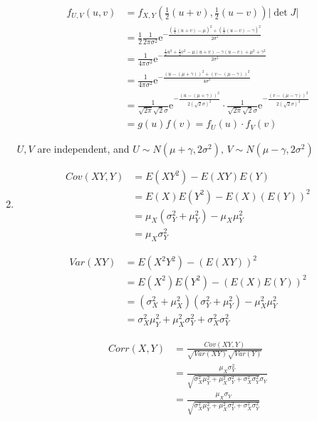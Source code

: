 \documentclass{article}
\begin{document}
\begin{enumerate}[leftmargin = 0 em, label = \arabic*., font = \bfseries]
	 \begin{align*}
	 f_{U,V}(u,v) &= f_{X,Y}(\frac{1}{2}(u+v), \frac{1}{2} (u-v))|\det J|\\
	 & =  \frac{1}{2} \frac{1}{2 \pi \sigma^2} \mathrm{e}^{- \frac{(\frac{1}{2}(u+v) - \mu)^2 + (\frac{1}{2}(u-v) - \gamma)^2}{2 \sigma^2}}\\
	 & = \frac{1}{4 \pi \sigma^2} \mathrm{e}^{- \frac{\frac{1}{2}u^2 + \frac{1}{2}v^2 - \mu(u + v) - \gamma(u - v) + \mu^2 + \gamma^2}{2 \sigma^2}}\\
	 & = \frac{1}{4 \pi \sigma^2} \mathrm{e}^{- \frac{(u - (\mu+ \gamma))^2 + (v - (\mu - \gamma))^2}{4 \sigma^2}}\\
	 & = \frac{1}{\sqrt{2 \pi} \sqrt{2}\sigma} \mathrm{e}^{- \frac{(u - (\mu + \gamma))^2}{2 (\sqrt{2}\sigma)^2}} \cdot \frac{1}{\sqrt{2 \pi} \sqrt{2}\sigma} \mathrm{e}^{- \frac{(v - (\mu - \gamma))^2}{2 (\sqrt{2}\sigma)^2}}\\
	 & = g(u)f(v) = f_U (u) \cdot f_{V}(v)
	 \end{align*}

	 $U,V$ are independent, and $U \sim N(\mu+\gamma, 2 \sigma^2),\, V \sim N(\mu - \gamma, 2 \sigma^2)$


	 \item 
	 \begin{align*}
	 Cov(XY, Y) & = E(XY^2) - E(XY)E(Y)\\
	 & = E(X)E(Y^2) - E(X)(E(Y))^2\\
	 & = \mu_X (\sigma_Y^2 + \mu_Y^2) - \mu_X \mu_Y^2\\
	 & = \mu_X \sigma_Y^2
	 \end{align*}

	 \begin{align*}
	 Var(XY) & = E(X^2 Y^2) - (E(XY))^2\\
	 & = E(X^2)E(Y^2) - (E(X) E(Y))^2\\
	 & = (\sigma_X^2 + \mu_X^2)(\sigma_Y^2 + \mu_{Y}^2) - \mu_X^2 \mu_Y^2\\
	 & = \sigma_X^2 \mu_Y^2 + \mu_X^2 \sigma_Y^2 + \sigma_X^2 \sigma_Y^2
	 \end{align*}

	 \begin{align*}
	 Corr(X,Y) & = \frac{Cov(XY,Y)}{\sqrt{Var(XY)}\sqrt{Var(Y)}}\\
	 & = \frac{\mu_X \sigma_Y^2}{\sqrt{\sigma_X^2 \mu_Y^2 + \mu_X^2 \sigma_Y^2 + \sigma_X^2 \sigma_Y^2} \sigma_Y} \\
	 & = \frac{\mu_X \sigma_Y}{\sqrt{\sigma_X^2 \mu_Y^2 + \mu_X^2 \sigma_Y^2 + \sigma_X^2 \sigma_Y^2}} 
	 \end{align*}



\end{enumerate}
\end{document}
